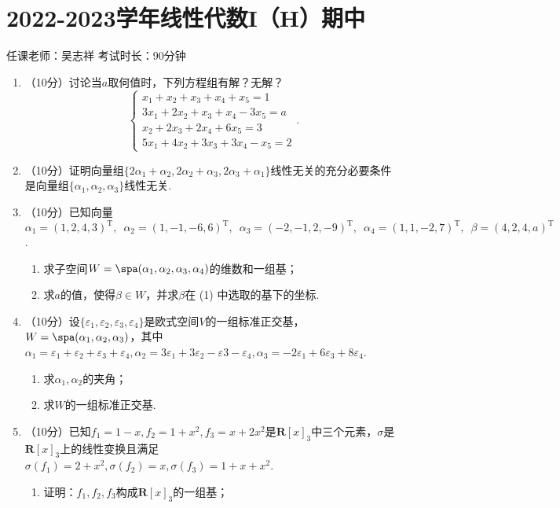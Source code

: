 \section{2022-2023学年线性代数I（H）期中}

\begin{center}
    任课老师：吴志祥\hspace{4em} 考试时长：90分钟
\end{center}

\begin{enumerate}
    \item （10分）讨论当$a$取何值时，下列方程组有解？无解？
    \[\begin{cases}
           x_1+x_2+x_3+x_4+x_5=1 \\
           3x_1+2x_2+x_3+x_4-3x_5=a \\
        x_2+2x_3+2x_4+6x_5=3 \\
        5x_1+4x_2+3x_3+3x_4-x_5=2
    \end{cases}.\]
    \item （10分）证明向量组$\{2\alpha_1+\alpha_2,2\alpha_2+\alpha_3,2\alpha_3+\alpha_1\}$线性无关的充分必要条件是向量组$\{\alpha_1,\alpha_2,\alpha_3\}$线性无关.
    \item （10分）已知向量$\alpha_1=(1,2,4,3)^\mathrm{T},\enspace \alpha_2=(1,-1,-6,6)^\mathrm{T},\enspace \alpha_3=(-2,-1,2,-9)^\mathrm{T},\enspace \alpha_4=(1,1,-2,7)^\mathrm{T},\enspace \beta=(4,2,4,a)^\mathrm{T}$.
       \begin{enumerate}
           \item 求子空间$W=\spa(\alpha_1,\alpha_2,\alpha_3,\alpha_4)$的维数和一组基；

        \item 求$a$的值，使得$\beta\in W$，并求$\beta$在 (1) 中选取的基下的坐标.
    \end{enumerate}
    \item （10分）设$\{\varepsilon_1,\varepsilon_2,\varepsilon_3,\varepsilon_4\}$是欧式空间$V$的一组标准正交基，$W=\spa(\alpha_1,\alpha_2,\alpha_3)$，其中$\alpha_1=\varepsilon_1+\varepsilon_2+\varepsilon_3+\varepsilon_4,\alpha_2=3\varepsilon_1+3\varepsilon_2-\varepsilon3-\varepsilon_4,\alpha_3=-2\varepsilon_1+6\varepsilon_3+8\varepsilon_4$.
    \begin{enumerate}
           \item 求$\alpha_1,\alpha_2$的夹角；

        \item 求$W$的一组标准正交基.
    \end{enumerate}
    \item （10分）已知$f_1=1-x,f_2=1+x^2,f_3=x+2x^2$是$\mathbf{R}[x]_3$中三个元素，$\sigma$是$\mathbf{R}[x]_3$上的线性变换且满足$\sigma(f_1)=2+x^2,\sigma(f_2)=x,\sigma(f_3)=1+x+x^2$.
    \begin{enumerate}
           \item 证明：$f_1,f_2,f_3$构成$\mathbf{R}[x]_3$的一组基；


\end{enumerate}
\end{enumerate}
